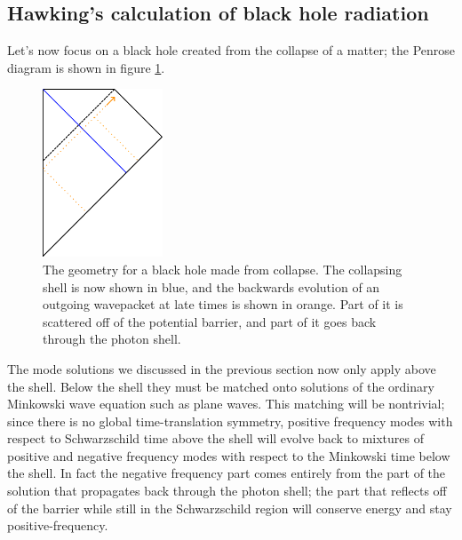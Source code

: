 \documentclass[12pt]{article}
\begin{document}
\subsection{Hawking's calculation of black hole radiation}\label{hawkrad}
Let's now focus on a black hole created from the collapse of a matter; the Penrose diagram is shown in figure \ref{collapse2}.
\begin{figure}
\begin{center}
\includegraphics[height=5cm]{collapse2.pdf}
\caption{The geometry for a black hole made from collapse.  The collapsing shell is now shown in blue, and the backwards evolution of an outgoing wavepacket at late times is shown in orange.  Part of it is scattered off of the potential barrier, and part of it goes back through the photon shell.}\label{collapse2}
\end{center}
\end{figure}
 
The mode solutions we discussed in the previous section now only apply above the shell.  Below the shell they must be matched onto solutions of the ordinary Minkowski wave equation such as plane waves.  This matching will be nontrivial;  since there is no global time-translation symmetry, positive frequency modes with respect to Schwarzschild time above the shell will evolve back to mixtures of positive and negative frequency modes with respect to the Minkowski time below the shell.  In fact the negative frequency part comes entirely from the part of the solution that propagates back through the photon shell; the part that reflects off of the barrier while still in the Schwarzschild region will conserve energy and stay positive-frequency.  
\end{document}
